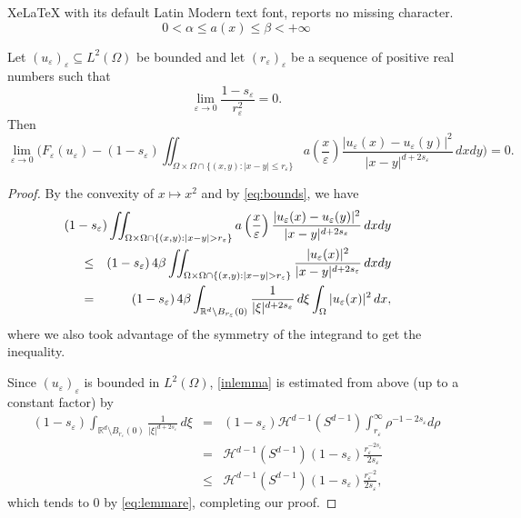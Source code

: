 \documentclass[10pt,a4paper]{amsart}
\newcommand\R{\mathbb{R}}    %
\newcommand\be{\begin{equation}}
\newcommand\ee{\end{equation}}
\newcommand\e{\varepsilon}
\begin{document}
XeLaTeX with its default Latin Modern text font, reports no missing character.
\begin{equation}\label{eq:bounds}
0<\alpha \leq a(x) \leq \beta<+\infty
\end{equation}

\begin{lemma}\label{lemma:locality} Let $(u_\e)_\e\subseteq L^2(\Omega)$ be bounded and let $(r_\e)_\e$ be a sequence of positive real numbers such that
\be\label{eq:lemmare}
\lim_{\e\to0}\frac{1-s_\e}{r_\e^2}=0.
\ee
Then 
\[
\lim_{\e\to0} \biggl(F_{\e}(u_\e)-(1-s_\e) \iint_{\Omega\times \Omega \cap \{(x,y) : |x-y|\leq r_\e\}}a\left(\frac{x}{\e}\right)\frac{|u_\e(x)-u_\e(y)|^2}{|x-y|^{d+2s_\e}}\,dxdy\biggr)=0 .
\]
\end{lemma}

\begin{proof}
 By the convexity of $x\mapsto x^2$ and by \eqref{eq:bounds}, we have
\begin{eqnarray} \label{inlemma} && \nonumber
\hskip-2cm(1-s_\e)\iint_{\Omega\times \Omega \cap \{(x,y) : |x-y| > r_\e\}}a\left(\frac{x}{\e}\right)\frac{|u_\e(x)-u_\e(y)|^2}{|x-y|^{d+2s_\e}}\,dxdy  \\ \nonumber
&\leq& (1-s_\e)\, 4 \beta \iint_{\Omega\times \Omega \cap \{(x,y) : |x-y| > r_\e\}}\frac{|u_\e(x)|^2}{|x-y|^{d+2s_\e}}\,dxdy    \\ 
&=& (1-s_\e)\, 4 \beta \int_{\R^d\setminus B_{r_\e}(0)}\frac{1}{|\xi|^{d+2s_\e}}\,d\xi\int_\Omega|u_\e(x)|^2\,dx,
\end{eqnarray}
where we also took advantage of the symmetry of the integrand to get the inequality.

Since $(u_\e)_\e$ is bounded in $L^2(\Omega)$, \eqref{inlemma} is estimated from above (up to a constant factor) by
\begin{eqnarray*}
    (1-s_\e)\int_{\R^d\setminus B_{r_\e}(0)}\frac{1}{|\xi|^{d+2s_\e}}\,d\xi& = &(1-s_\e)\mathcal{H}^{d-1}(S^{d-1})\int_{r_\e}^{\infty}\rho^{-1-2s_\e}d\rho\\
    &=& \mathcal{H}^{d-1}(S^{d-1})(1-s_\e)\frac{r_\e^{-2s_\e}}{2s_\e}\\
    &\leq& \mathcal{H}^{d-1}(S^{d-1})(1-s_\e)\frac{r_\e^{-2}}{2s_\e},
\end{eqnarray*}
which tends to $0$ by \eqref{eq:lemmare}, completing our proof.
\end{proof}
\end{document}
